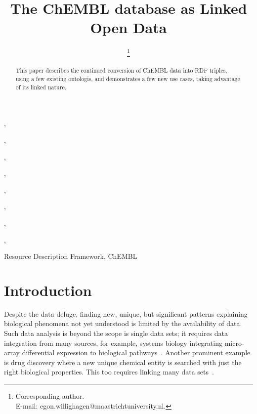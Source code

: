 \documentclass[sw]{iosart2c}
\begin{document}
\newcommand{\url}[1]{#1}

\begin{frontmatter}

\title{The ChEMBL database as Linked Open Data}



\author[A]{ \thanks{Corresponding author.\\ E-mail: egon.willighagen@maastrichtuniversity.nl.}}
\author[A]{ }
\author[B]{ },
\author[C]{ },
\author[D]{ },
\author[D]{ },
\author[E]{ },
\author[F]{ },
\author[F]{ },
\author[G]{ },
\author[G]{ }

\address[A]{Department of Bioinformatics - BiGCaT, Maastricht University, ADDRESS, Maastricht,\\ The Netherlands}
\address[B]{Uppsala University}
\address[C]{University of Queensland}
\address[D]{Royal Society of Chemistry, 904 Tamaras Circle, Wake Forest, NC 27587, U.S.A.}
\address[E]{ChEBI, European Bioinformatics Institute}
\address[F]{ChEMBL, European Bioinformatics Institute}
\address[G]{Indiana University}

\begin{abstract}
This paper describes the continued conversion of ChEMBL data into RDF triples, using a few existing
ontologis, and demonstrates a few new use cases, taking advantage of its linked nature.
\end{abstract}

\begin{keyword}
Resource Description Framework, ChEMBL
\end{keyword}

\end{frontmatter}


\section{Introduction}\label{s1}

Despite the data deluge, finding new, unique, but significant patterns explaining biological
phenomena not yet understood is limited by the availability of data. Such data analysis is
beyond the scope is single data sets; it requires data integration from many sources, for
example, systems biology integrating micro-array differential expression to biological
pathways~\cite{}. Another prominent example is drug discovery where a new unique chemical entity is
searched with just the right biological properties. This too requires linking many
data sets~\cite{Samwald2011,OpenPHACTS}.
\end{document}
